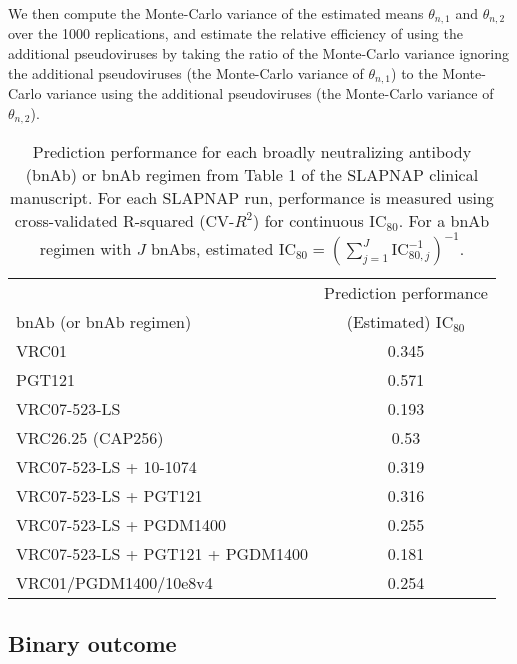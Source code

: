 \documentclass[10pt]{article}
\begin{document}
We then compute the Monte-Carlo variance of the estimated means $\theta_{n,1}$ and $\theta_{n,2}$ over the 1000 replications, and estimate the relative efficiency of using the additional pseudoviruses by taking the ratio of the Monte-Carlo variance ignoring the additional pseudoviruses (the Monte-Carlo variance of $\theta_{n,1}$) to the Monte-Carlo variance using the additional pseudoviruses (the Monte-Carlo variance of $\theta_{n,2}$).

\begin{table}
    \centering
    \caption{Prediction performance for each broadly neutralizing antibody (bnAb) or bnAb regimen from Table 1 of the SLAPNAP clinical manuscript. For each SLAPNAP run, performance is measured using cross-validated R-squared (CV-$R^2$) for continuous IC$_{80}$. For a bnAb regimen with $J$ bnAbs, estimated $\text{IC}_{80} = \left(\sum_{j=1}^J \text{IC}_{80,j}^{-1}\right)^{-1}$.}
    \begin{tabular}{l|c}
        & \multicolumn{1}{c}{Prediction performance} \\
        bnAb (or bnAb regimen) & (Estimated) IC$_{80}$ \\
        \hline
        VRC01 & 0.345  \\
        PGT121 & 0.571 \\
        VRC07-523-LS & 0.193 \\
        VRC26.25 (CAP256) & 0.53 \\
        VRC07-523-LS + 10-1074 & 0.319 \\
        VRC07-523-LS + PGT121 & 0.316 \\
        VRC07-523-LS + PGDM1400 & 0.255 \\
        VRC07-523-LS + PGT121 + PGDM1400 & 0.181 \\
        VRC01/PGDM1400/10e8v4 & 0.254
    \end{tabular}
    \label{tab:perf-continuous}
\end{table}

\subsection{Binary outcome}
\end{document}
